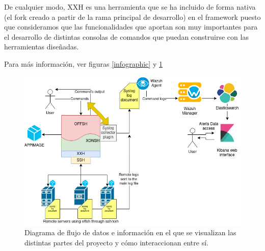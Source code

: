 De cualquier modo, XXH es una herramienta que se ha incluido de forma nativa (el fork creado a partir de la rama principal de desarrollo) en el framework puesto que consideramos que las funcionalidades que aportan son muy importantes para el desarrollo de distintas consolas de comandos que puedan construirse con las herramientas diseñadas.

Para más información, ver figuras \ref{infographic} y \ref{diagramica}

\begin{figure}[!hbt]
  \centering
  \includegraphics[width=\textwidth]{imagenes/diagramaflujo.png}
  \caption{Diagrama de flujo de datos e información en el que se visualizan las distintas partes del proyecto y cómo interaccionan entre sí. }
  \label{diagramica}
\end{figure}


